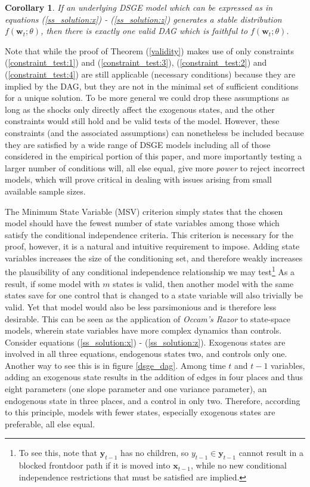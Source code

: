 \documentclass{article}
\newtheorem{corollary}{Corollary}
\begin{document}
\theoremstyle{corollary}
\begin{corollary}
  If an underlying DSGE model which can be expressed as in equations (\ref{ss_solution:x}) - (\ref{ss_solution:z}) generates a \textit{stable} distribution $f(\mathbf{w}_t;\theta)$, then there is exactly one valid DAG which is faithful to $f(\mathbf{w}_t;\theta)$.
  \label{unique_dag}
\end{corollary}

Note that while the proof of Theorem (\ref{validity}) makes use of only constraints (\ref{constraint_test:1}) and (\ref{constraint_test:3}), (\ref{constraint_test:2}) and (\ref{constraint_test:4}) are still applicable (necessary conditions) because they are implied by the DAG, but they are not in the minimal set of sufficient conditions for a unique solution. To be more general we could drop these assumptions as long as the shocks only directly affect the exogenous states, and the other constraints would still hold and be valid tests of the model. However, these constraints (and the associated assumptions) can nonetheless be included because they are satisfied by a wide range of DSGE models including all of those considered in the empirical portion of this paper, and more importantly testing a larger number of conditions will, all else equal, give more \textit{power} to reject incorrect models, which will prove critical in dealing with issues arising from small available sample sizes.

The Minimum State Variable (MSV) criterion simply states that the chosen model should have the fewest number of state variables among those which satisfy the conditional independence criteria. This criterion is necessary for the proof, however, it is a natural and intuitive requirement to impose. Adding state variables increases the size of the conditioning set, and therefore weakly increases the plausibility of any conditional independence relationship we may test\footnote{To see this, note that $\mathbf{y}_{t-1}$ has no children, so $y_{t-1} \in \mathbf{y}_{t-1}$ cannot result in a blocked frontdoor path if it is moved into $\mathbf{x}_{t-1}$, while no new conditional independence restrictions that must be satisfied are implied.} As a result, if some model with $m$ states is valid, then another model with the same states save for one control that is changed to a state variable will also trivially be valid. Yet that model would also be less parsimonious and is therefore less desirable. This can be seen as the application of \textit{Occam's Razor} to state-space models, wherein state variables have more complex dynamics than controls. Consider equations (\ref{ss_solution:x}) - (\ref{ss_solution:z}). Exogenous states are involved in all three equations, endogenous states two, and controls only one. Another way to see this is in figure \ref{dsge_dag}. Among time $t$ and $t-1$ variables, adding an exogenous state results in the addition of edges in four places and thus eight parameters (one slope parameter and one variance parameter), an endogenous state in three places, and a control in only two. Therefore, according to this principle, models with fewer states, especially exogenous states are preferable, all else equal. 
\end{document}
